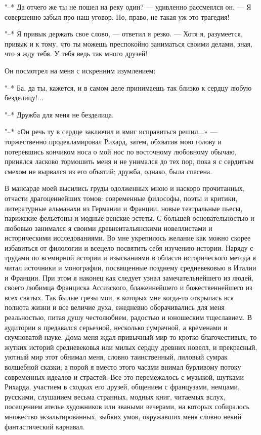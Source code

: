 "--* Да отчего  же ты не пошел на реку  один? --- удивленно рассмеялся
он. --- Я совершенно забыл про наш  уговор. Но, право, не такая уж это
трагедия!

"--* Я  привык держать свое  слово, --- ответил  я резко. ---  Хотя я,
разумеется,  привык и  к тому,  что ты  можешь преспокойно  заниматься
своими делами, зная, что я жду тебя. У тебя ведь так много друзей!

Он посмотрел на меня с искренним изумлением:

"--* Ба, да ты, кажется, и в самом деле принимаешь так близко к сердцу
любую безделицу!...

"--* Дружба для меня не безделица.

"--* «Он  речь ту в сердце  заключил и вмиг исправиться  решил...» ---
торжественно  продекламировал Рихард,  затем,  обхватив  мою голову  и
потеревшись кончиком  носа о мой  нос по восточному  любовному обычаю,
принялся ласково  тормошить меня и  не унимался до  тех пор, пока  я с
сердитым  смехом не  вырвался  из его  объятий;  дружба, однако,  была
спасена.

В мансарде моей высились груды  одолженных мною и наскоро прочитанных,
отчасти драгоценнейших  томов: современные философы, поэты  и критики,
литературные  альманахи  из  Германии  и  Франции,  новые  театральные
пьесы,  парижские  фельетоны  и   модные  венские  эстеты.  С  большей
основательностью  и  любовью  занимался  я  своими  древнеитальянскими
новеллистами и историческими исследованиями. Во мне укрепилось желание
как  можно скорее  избавиться от  филологии и  всецело посвятить  себя
изучению истории. Наряду с трудами  по всемирной истории и изысканиями
в  области  исторического  метода  я  читал  источники  и  монографии,
посвященные  позднему  средневековью  в  Италии и  Франции.  При  этом
я  наконец  как  следует  узнал  замечательнейшего  из  людей,  своего
любимца Франциска Ассизского, блаженнейшего и божественнейшего из всех
святых.  Так  былые  грезы  мои,  в  которых  мне  когда-то  открылась
вся  полнота жизни  и все  величие духа,  ежедневно оборачивались  для
меня  реальностью,  питая  душу   честолюбием,  радостью  и  юношеским
тщеславием. В  аудитории я предавался серьезной,  несколько сумрачной,
а  временами  и  скучноватой  науке.  Дома  меня  ждал  привычный  мир
то  кротко-благочестивых, то  жутких историй  средневековья или  милых
сердцу древних  новелл, и  прекрасный, уютный  мир этот  обнимал меня,
словно  таинственный,  лиловый  сумрак  волшебной сказки;  а  порой  я
вместо  этого часами  внимал  бурливому потоку  современных идеалов  и
страстей. Все  это перемежалось  с музыкой, шутками  Рихарда, участием
в  сходках  его  друзей,  общением с  французами,  немцами,  русскими,
слушанием  весьма странных,  модных книг,  читаемых вслух,  посещением
ателье  художников   или  зваными  вечерами,  на   которых  собиралось
множество экзальтированных, зыбких умов,  окружавших меня словно некий
фантастический карнавал.

